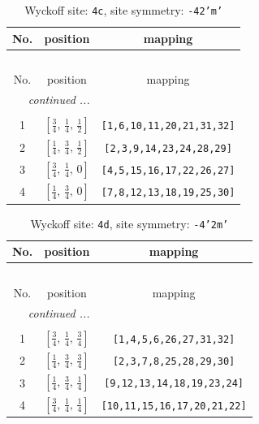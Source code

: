 \documentclass[fleqn,8pt]{jsarticle}
\begin{document}
\renewcommand{\arraystretch}{1.2}
\begin{longtable}{ccc}
\caption{Wyckoff site: {\tt 4c}, site symmetry: {\tt -42'm'}}
 \\
 \hline \hline
No. & position & mapping \\ \hline \endfirsthead

\multicolumn{2}{l}{\tablename\ \thetable{}} \\
 \hline \hline
No. & position & mapping \\ \hline \endhead

 \hline \hline
\multicolumn{2}{r}{\footnotesize\it continued ...} \\ \endfoot

 \hline \hline
\multicolumn{2}{r}{} \\ \endlastfoot

1 & $\left[ \frac{3}{4},\, \frac{1}{4},\, \frac{1}{2} \right]$ & {\tt [1,6,10,11,20,21,31,32]} \\ \hline
2 & $\left[ \frac{1}{4},\, \frac{3}{4},\, \frac{1}{2} \right]$ & {\tt [2,3,9,14,23,24,28,29]} \\ \hline
3 & $\left[ \frac{3}{4},\, \frac{1}{4},\, 0 \right]$ & {\tt [4,5,15,16,17,22,26,27]} \\ \hline
4 & $\left[ \frac{1}{4},\, \frac{3}{4},\, 0 \right]$ & {\tt [7,8,12,13,18,19,25,30]} \\
\end{longtable}
\renewcommand{\arraystretch}{1.2}
\begin{longtable}{ccc}
\caption{Wyckoff site: {\tt 4d}, site symmetry: {\tt -4'2m'}}
 \\
 \hline \hline
No. & position & mapping \\ \hline \endfirsthead

\multicolumn{2}{l}{\tablename\ \thetable{}} \\
 \hline \hline
No. & position & mapping \\ \hline \endhead

 \hline \hline
\multicolumn{2}{r}{\footnotesize\it continued ...} \\ \endfoot

 \hline \hline
\multicolumn{2}{r}{} \\ \endlastfoot

1 & $\left[ \frac{3}{4},\, \frac{1}{4},\, \frac{3}{4} \right]$ & {\tt [1,4,5,6,26,27,31,32]} \\ \hline
2 & $\left[ \frac{1}{4},\, \frac{3}{4},\, \frac{3}{4} \right]$ & {\tt [2,3,7,8,25,28,29,30]} \\ \hline
3 & $\left[ \frac{1}{4},\, \frac{3}{4},\, \frac{1}{4} \right]$ & {\tt [9,12,13,14,18,19,23,24]} \\ \hline
4 & $\left[ \frac{3}{4},\, \frac{1}{4},\, \frac{1}{4} \right]$ & {\tt [10,11,15,16,17,20,21,22]} \\
\end{longtable}
\end{document}
